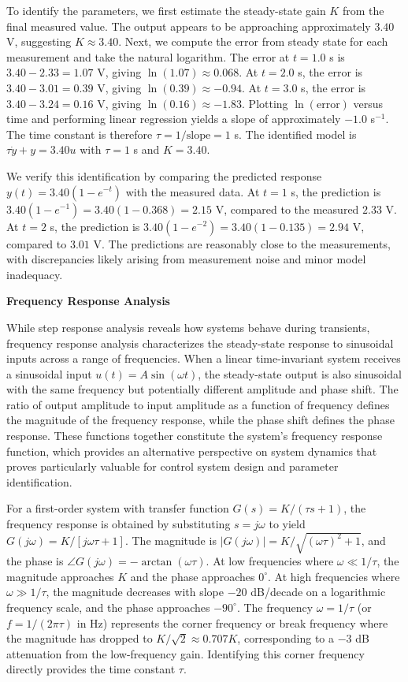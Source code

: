 To identify the parameters, we first estimate the steady-state gain $K$ from the final measured value. The output appears to be approaching approximately $3.40$ V, suggesting $K \approx 3.40$. Next, we compute the error from steady state for each measurement and take the natural logarithm. The error at $t = 1.0$ s is $3.40 - 2.33 = 1.07$ V, giving $\ln(1.07) \approx 0.068$. At $t = 2.0$ s, the error is $3.40 - 3.01 = 0.39$ V, giving $\ln(0.39) \approx -0.94$. At $t = 3.0$ s, the error is $3.40 - 3.24 = 0.16$ V, giving $\ln(0.16) \approx -1.83$. Plotting $\ln(\text{error})$ versus time and performing linear regression yields a slope of approximately $-1.0$ s$^{-1}$. The time constant is therefore $\tau = 1/\text{slope} = 1$ s. The identified model is $\tau \dot{y} + y = 3.40 u$ with $\tau = 1$ s and $K = 3.40$.

We verify this identification by comparing the predicted response $y(t) = 3.40(1 - e^{-t})$ with the measured data. At $t = 1$ s, the prediction is $3.40(1 - e^{-1}) = 3.40(1 - 0.368) = 2.15$ V, compared to the measured $2.33$ V. At $t = 2$ s, the prediction is $3.40(1 - e^{-2}) = 3.40(1 - 0.135) = 2.94$ V, compared to $3.01$ V. The predictions are reasonably close to the measurements, with discrepancies likely arising from measurement noise and minor model inadequacy.

\textbf{Frequency Response Analysis}

While step response analysis reveals how systems behave during transients, frequency response analysis characterizes the steady-state response to sinusoidal inputs across a range of frequencies. When a linear time-invariant system receives a sinusoidal input $u(t) = A\sin(\omega t)$, the steady-state output is also sinusoidal with the same frequency but potentially different amplitude and phase shift. The ratio of output amplitude to input amplitude as a function of frequency defines the magnitude of the frequency response, while the phase shift defines the phase response. These functions together constitute the system's frequency response function, which provides an alternative perspective on system dynamics that proves particularly valuable for control system design and parameter identification.

For a first-order system with transfer function $G(s) = K/(\tau s + 1)$, the frequency response is obtained by substituting $s = j\omega$ to yield $G(j\omega) = K/[j\omega\tau + 1]$. The magnitude is $|G(j\omega)| = K/\sqrt{(\omega\tau)^2 + 1}$, and the phase is $\angle G(j\omega) = -\arctan(\omega\tau)$. At low frequencies where $\omega \ll 1/\tau$, the magnitude approaches $K$ and the phase approaches $0^\circ$. At high frequencies where $\omega \gg 1/\tau$, the magnitude decreases with slope $-20$ dB/decade on a logarithmic frequency scale, and the phase approaches $-90^\circ$. The frequency $\omega = 1/\tau$ (or $f = 1/(2\pi\tau)$ in Hz) represents the corner frequency or break frequency where the magnitude has dropped to $K/\sqrt{2} \approx 0.707K$, corresponding to a $-3$ dB attenuation from the low-frequency gain. Identifying this corner frequency directly provides the time constant $\tau$.

